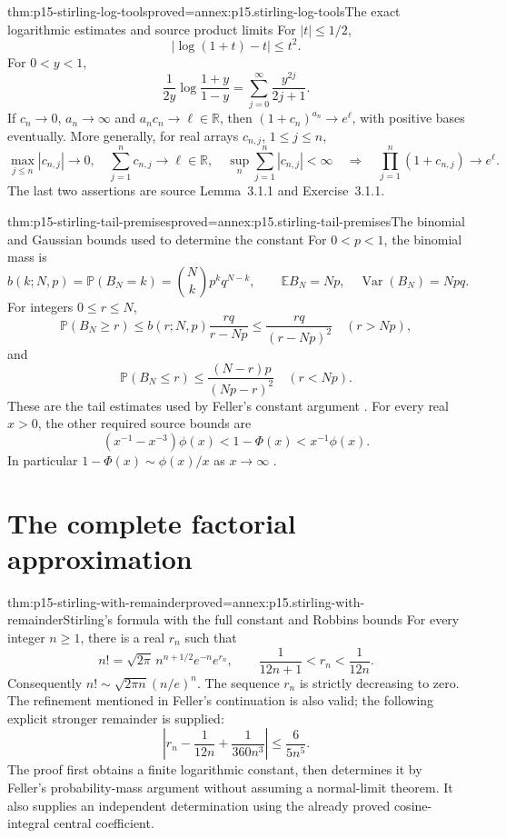 \begin{hblemma}{thm:p15-stirling-log-tools}{proved=annex:p15.stirling-log-tools}{The exact logarithmic estimates and source product limits}
For \(|t|\leq1/2\),
\[
 |\log(1+t)-t|\leq t^2.
\]
For \(0<y<1\),
\[
 \frac1{2y}\log\frac{1+y}{1-y}
       =\sum_{j=0}^\infty\frac{y^{2j}}{2j+1}.
\]
If \(c_n\to0\), \(a_n\to\infty\) and \(a_nc_n\to\ell\in\mathbb R\),
then \((1+c_n)^{a_n}\to e^\ell\), with positive bases eventually.
More generally, for real arrays \(c_{n,j}\), \(1\leq j\leq n\),
\[
 \max_{j\leq n}|c_{n,j}|\to0,\quad
 \sum_{j=1}^nc_{n,j}\to\ell\in\mathbb R,\quad
 \sup_n\sum_{j=1}^n|c_{n,j}|<\infty
 \quad\Longrightarrow\quad
 \prod_{j=1}^n(1+c_{n,j})\to e^\ell.
\]
The last two assertions are source Lemma~3.1.1 and Exercise~3.1.1.
\end{hblemma}

\begin{hblemma}{thm:p15-stirling-tail-premises}{proved=annex:p15.stirling-tail-premises}{The binomial and Gaussian bounds used to determine the constant}
For \(0<p<1\), the binomial mass is
\[
 b(k;N,p)=\mathbb P(B_N=k)=\binom Nk p^kq^{N-k},
 \qquad \mathbb EB_N=Np,\quad\operatorname{Var}(B_N)=Npq.
\]
For integers \(0\leq r\leq N\),
\[
 \mathbb P(B_N\geq r)\leq
 b(r;N,p)\frac{rq}{r-Np}
 \leq\frac{rq}{(r-Np)^2}\quad(r>Np),
\]
and
\[
 \mathbb P(B_N\leq r)\leq\frac{(N-r)p}{(Np-r)^2}
                                             \quad(r<Np).
\]
These are the tail estimates used by Feller's constant argument
\cite[VI.3, pp.~150--151]{Feller1968ProbabilityI}.
For every real \(x>0\), the other required source bounds are
\[
 (x^{-1}-x^{-3})\phi(x)<1-\Phi(x)<x^{-1}\phi(x).
\]
In particular \(1-\Phi(x)\sim\phi(x)/x\) as \(x\to\infty\)
\cite[VII.1, pp.~175, 179]{Feller1968ProbabilityI}.
\end{hblemma}

\section{The complete factorial approximation}
\label{sec:p15-stirling-formula}

\begin{hbtheorem}{thm:p15-stirling-with-remainder}{proved=annex:p15.stirling-with-remainder}{Stirling's formula with the full constant and Robbins bounds}
For every integer \(n\geq1\), there is a real \(r_n\) such that
\[
 n!=\sqrt{2\pi}\,n^{n+1/2}e^{-n}e^{r_n},\qquad
 \frac1{12n+1}<r_n<\frac1{12n}.
\]
Consequently \(n!\sim\sqrt{2\pi n}(n/e)^n\).
The sequence \(r_n\) is strictly decreasing to zero.
The refinement mentioned in Feller's continuation is also valid;
the following explicit stronger remainder is supplied:
\[
 \left|r_n-\frac1{12n}+\frac1{360n^3}\right|
                     \leq\frac6{5n^5}.
\]
The proof first obtains a finite logarithmic constant, then
determines it by Feller's probability-mass argument without
assuming a normal-limit theorem. It also supplies an independent
determination using the already proved cosine-integral central
coefficient.
\end{hbtheorem}


